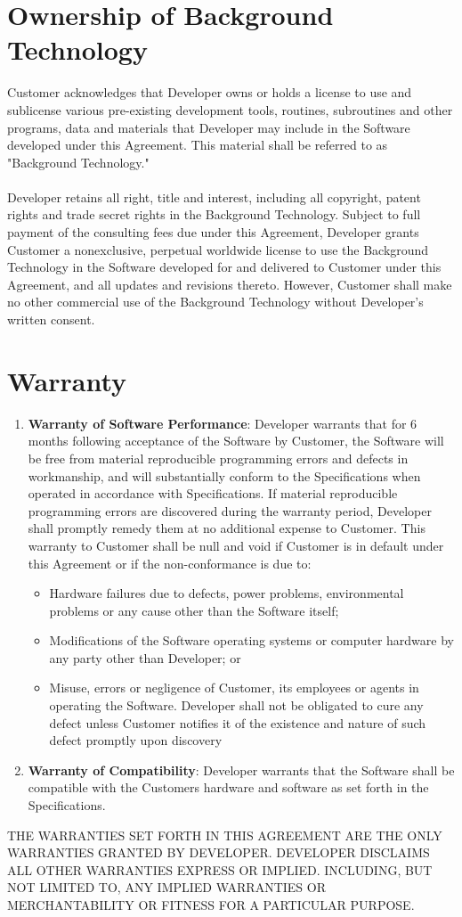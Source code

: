 \documentclass[11pt]{article}
\begin{document}
\section{Ownership of Background Technology}
Customer acknowledges that Developer owns or holds a license to use and sublicense various pre-existing development tools, routines, subroutines and other programs, data and materials that Developer may include in the Software developed under this Agreement. This material shall be referred to as "Background Technology."  \\\\
Developer retains all right, title and interest, including all copyright, patent rights and trade secret rights in the Background Technology. Subject to full payment of the consulting fees due under this Agreement, Developer grants Customer a nonexclusive, perpetual worldwide license to use the Background Technology in the Software developed for and delivered to Customer under this Agreement, and all updates and revisions thereto. However, Customer shall make no other commercial use of the Background Technology without Developer’s written consent.
\section{Warranty}
\begin{enumerate}
\renewcommand{\labelenumi}{(\Alph{enumi})}
\item {\bf Warranty of Software Performance}: Developer warrants that for 6 months following acceptance of the Software by Customer, the Software will be free from material reproducible programming errors and defects in workmanship, and will substantially conform to the Specifications when operated in accordance with Specifications. If material reproducible programming errors are discovered during the warranty period, Developer shall promptly remedy them at no additional expense to Customer. This warranty to Customer shall be null and void if Customer is in default under this Agreement or if the non-conformance is due to:
\begin{itemize}
\item Hardware failures due to defects, power problems, environmental problems or any cause other than the Software itself;
\item Modifications of the Software operating systems or computer hardware by any party other than Developer; or
\item Misuse, errors or negligence of Customer, its employees or agents in operating the Software. Developer shall not be obligated to cure any defect unless Customer notifies it of the existence and nature of such defect promptly upon discovery
\end{itemize}
\item {\bf  Warranty of Compatibility}: Developer warrants that the Software shall be compatible with the Customers hardware and software as set forth in the Specifications. 
\end{enumerate}
THE WARRANTIES SET FORTH IN THIS AGREEMENT ARE THE ONLY WARRANTIES GRANTED BY DEVELOPER. DEVELOPER DISCLAIMS ALL OTHER WARRANTIES EXPRESS OR IMPLIED. INCLUDING, BUT NOT LIMITED TO, ANY IMPLIED WARRANTIES OR MERCHANTABILITY OR FITNESS FOR A PARTICULAR PURPOSE.
\end{document}
